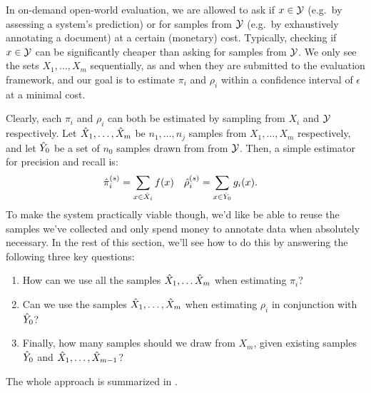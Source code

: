 In on-demand open-world evaluation, we are allowed to ask if $x \in \mathcal{Y}$ (e.g.\ by assessing a system's prediction) or for samples from $\mathcal{Y}$ (e.g.\ by exhaustively annotating a document) at a certain (monetary) cost.
Typically, checking if $x \in \mathcal{Y}$ can be significantly cheaper than asking for samples from $\mathcal{Y}$.
We only see the sets $X_1, \ldots, X_m$ sequentially, as and when they are submitted to the evaluation framework, and
  our goal is to estimate $\pi_i$ and $\rho_i$ within a confidence interval of $\epsilon$ at a minimal cost. 

Clearly, each $\pi_i$ and $\rho_i$ can both be estimated by sampling from $X_i$ and $\mathcal{Y}$ respectively.
Let ${\hat{X}}_1, \ldots, {\hat{X}}_m$ be $n_1, \ldots, n_j$ samples from $X_1, \ldots, X_m$ respectively, and let ${\hat{Y}}_0$ be a set of $n_0$ samples drawn from from $\mathcal{Y}$.
Then, a simple estimator for precision and recall is:
\begin{align*}
  {\hat{\pi}}_i^{(s)} &= \sum_{x \in {\hat{X}}_i} f(x) & {\hat{\rho}}_i^{(s)} &= \sum_{x \in {\hat{Y}}_0} g_i(x).
\end{align*}
To make the system practically viable though, we'd like be able to reuse the samples we've collected and only spend money to annotate data when absolutely necessary.
In the rest of this section, we'll see how to do this by answering the following three key questions:
\begin{enumerate}
  \item How can we use all the samples ${\hat{X}}_1, \ldots {\hat{X}}_m$ when estimating $\pi_i$?
  \item Can we use the samples ${\hat{X}}_1, \ldots, {\hat{X}}_m$ when estimating $\rho_i$ in conjunction with ${\hat{Y}}_0$?
  \item Finally, how many samples should we draw from $X_m$, given existing samples ${\hat{Y}}_0$ and ${\hat{X}}_1, \ldots, {\hat{X}}_{m-1}$?
\end{enumerate}
The whole approach is summarized in .


